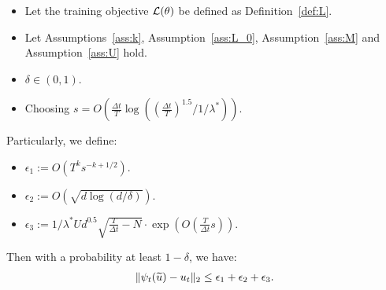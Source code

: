 \begin{lemma}
\begin{itemize}
        \item Let the training objective ${\cal L}(\theta)$ be defined as Definition~\ref{def:L}.
        \item Let Assumptions~\ref{ass:k}, Assumption~\ref{ass:L_0}, Assumption~\ref{ass:M} and Assumption~\ref{ass:U} hold.
        \item $\delta \in (0, 1)$.
        \item Choosing $s = O(\frac{\Delta t}{T}\log((\frac{\Delta t}{T})^{1.5}/1/\lambda^*))$.
    \end{itemize}
    Particularly, we define:
    \begin{itemize}
        \item $\epsilon_1 := O(T^k s^{-k+1/2})$.
        \item $\epsilon_2 := O(\sqrt{d\log(d/\delta)})$.
        \item $\epsilon_3 := 1/\lambda^* U d^{0.5} \sqrt{\frac{T}{\Delta t} - N} \cdot \exp(O(\frac{T}{\Delta t}s))$.
    \end{itemize}
    Then with a probability at least $1 - \delta$, we have:
    \begin{align*}
        \| \psi_t(\widetilde{u}) - u_t \|_2 \leq \epsilon_1 + \epsilon_2 + \epsilon_3.
    \end{align*}
\end{lemma}


